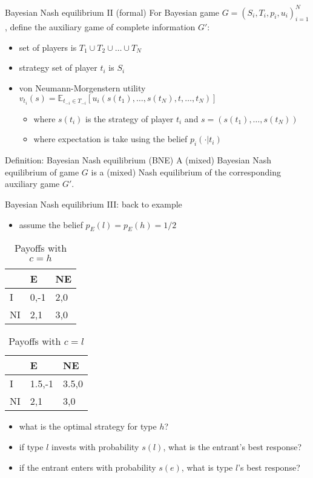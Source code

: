 \documentclass[bigger]{beamer}
\begin{document}
\begin{frame}[label={sec:orgc37b21e}]{Bayesian Nash equilibrium II (formal)}
For Bayesian game \(G=(S_i,T_i,p_i,u_i)_{i=1}^N\), define the auxiliary game of complete information \(G'\):
\begin{itemize}
\item set of players is \(T_1\cup T_2\cup \dots\cup T_N\)
\item strategy set of player \(t_i\) is \(S_i\)
\item von Neumann-Morgenstern utility \(v_{t_i}(s)=\mathbb{E}_{t_{-i}\in T_{-i}}[u_i(s(t_1),\dots,s(t_N),t,\dots,t_N)]\)
\begin{itemize}
\item where \(s(t_i)\) is the strategy of player \(t_i\) and \(s=(s(t_1),\dots,s(t_N))\)
\item where expectation is take using the belief \(p_i(\cdot|t_i)\)
\end{itemize}
\end{itemize}

\begin{block}{Definition: Bayesian Nash equilibrium (BNE)}
A (mixed) Bayesian Nash equilibrium of game \(G\) is a (mixed) Nash equilibrium of the corresponding auxiliary game \(G'\).
\end{block}
\end{frame}

\begin{frame}[label={sec:org048c702}]{Bayesian Nash equilibrium III: back to example}
\begin{itemize}
\item assume the belief \(p_E(l)=p_E(h)=1/2\)
\end{itemize}

\begin{table}[htbp]
\caption{Payoffs with \(c=h\)}
\centering
\begin{tabular}{l|ll}
 & E & NE\\
\hline
I & 0,-1 & 2,0\\
NI & 2,1 & 3,0\\
\end{tabular}
\end{table}
\begin{table}[htbp]
\caption{Payoffs with \(c=l\)}
\centering
\begin{tabular}{l|ll}
 & E & NE\\
\hline
I & 1.5,-1 & 3.5,0\\
NI & 2,1 & 3,0\\
\end{tabular}
\end{table}

\begin{itemize}
\item what is the optimal strategy for type \(h\)?
\item if type \(l\) invests with probability \(s(l)\), what is the entrant's best response?
\item if the entrant enters with probability \(s(e)\), what is type \(l\)'s best response?
\end{itemize}
\end{frame}
\end{document}
